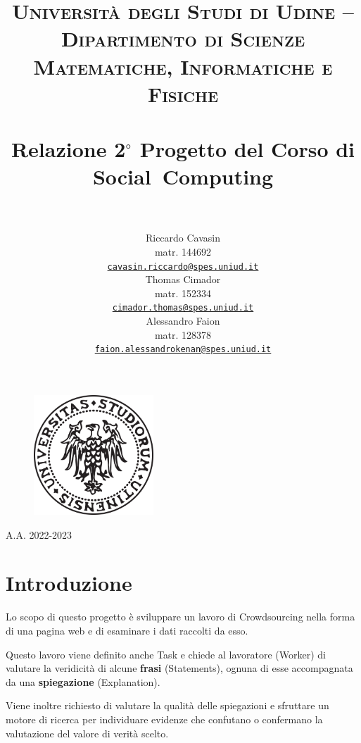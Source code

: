 \documentclass[a4paper, 11pt, twoside]{article}
\title{
    \vspace{-50pt}
    \textsc{Università degli Studi di Udine -- Dipartimento di Scienze Matematiche, Informatiche e Fisiche} \\ 
    \vfill
    \horrule{1pt}\\
    \huge{Relazione 2$^{\circ}$ Progetto del Corso di Social~Computing}\\
    \horrule{1pt}\\
    \vfill
    }
\author{ %
    Riccardo Cavasin\\ 
    matr. 144692\\ 
    \vspace{18pt}
    \href{mailto:cavasin.riccardo@spes.uniud.it}{\texttt{cavasin.riccardo@spes.uniud.it}}\\
    Thomas Cimador\\ 
    matr. 152334\\ 
    \vspace{18pt}
    \href{mailto:cimador.thomas@spes.uniud.it}{\texttt{cimador.thomas@spes.uniud.it}}\\
    Alessandro Faion\\ 
    matr. 128378\\ 
    \vspace{18pt}
    \href{mailto:faion.alessandrokenan@spes.uniud.it}{\texttt{faion.alessandrokenan@spes.uniud.it}}\\
}
\date{}
\begin{document}
\begin{titlepage}
    \begin{figure}[t]
        \includegraphics[width=4.5cm, height=4.5cm]{uniud_logo.png}
        \centering
    \end{figure}
    \maketitle
    \vfill
    \begin{center}
        \large{A.A. 2022-2023}
    \end{center}
    \thispagestyle{empty}
\end{titlepage}

\tableofcontents
\thispagestyle{empty}  %
\newpage               %
\setcounter{page}{1}   %

\section{Introduzione}\label{sec:intro}
Lo scopo di questo progetto è sviluppare un lavoro di Crowdsourcing nella forma di una pagina web e di esaminare i dati raccolti da esso.

Questo lavoro viene definito anche Task e chiede al lavoratore (Worker) di valutare la veridicità di alcune \textbf{frasi} (Statements), ognuna di esse accompagnata da una \textbf{spiegazione} (Explanation).

Viene inoltre richiesto di valutare la qualità delle spiegazioni e sfruttare un motore di ricerca per individuare evidenze che confutano o confermano la valutazione del valore di verità scelto. \\
\end{document}
